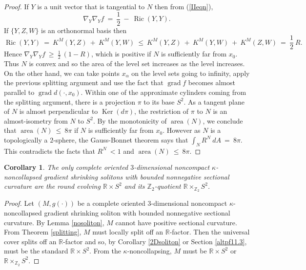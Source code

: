 \documentclass[12pt]{amsart}
\newcommand{\area}{\operatorname{area}}
\newcommand{\grad}{\operatorname{grad}}
\newcommand{\Ker}{\operatorname{Ker}}
\newcommand{\R}{{\mathbb R}}
\newcommand{\Ric}{\operatorname{Ric}}
\newcommand{\Z}{{\mathbb Z}}
\numberwithin{equation}{section}
\theoremstyle{plain}
\newtheorem{corollary}[equation]{Corollary}
\theoremstyle{definition}
\theoremstyle{remark}
\begin{document}
\begin{proof}
If $Y$ is a unit vector that is tangential to $N$ then from (\ref{IIeqn}),
\begin{equation}
\nabla_Y \nabla_Y f \: = \: \frac12 \: - \: \Ric(Y,Y).
\end{equation}
If $\{Y, Z, W\}$ is an orthonormal basis then
\begin{equation}
\Ric(Y, Y) \: = \: K^M(Y,Z) \: + \: K^M(Y, W) \: \le \:
K^M(Y,Z) \: + \: K^M(Y, W) \: + \: K^M(Z, W) \: = \: \frac12 \: R.
\end{equation}
Hence $\nabla_Y \nabla_Y f \: \ge \: \frac12 \: (1-R)$, which is
positive if $N$ is sufficiently far from $x_0$. Thus $N$ is convex
and so 
the area of the level set increases as the level increases.
On the other hand, 
we can take points $x_\alpha$ on the level sets going to
infinity, apply the previous splitting argument 
and use the fact that $\grad f$ becomes almost parallel to
$\grad d(\cdot, x_0)$. Within one of the approximate cylinders coming from the
splitting argument, there is a projection $\pi$ to its base $S^2$. As
a tangent plane of $N$ is almost perpendicular to $\Ker(d\pi)$,
the restriction of $\pi$ to $N$ is an almost-isometry from
$N$ to $S^2$.
By the monotonicity of $\area(N)$, we conclude that
$\area(N) \: \le \: 8\pi$ if $N$ is sufficiently far from $x_0$.
However as $N$ is a topologically a $2$-sphere, 
the Gauss-Bonnet theorem says that
$\int_N R^N \: dA \: = \: 8\pi$. This contradicts the facts that
$R^N \: < 1$ and $\area(N) \: \le \: 8\pi$.
\end{proof}

\begin{corollary} \label{cornosoliton}
The only complete oriented $3$-dimensional noncompact
$\kappa$-noncollapsed gradient shrinking solitons with 
bounded nonnegative sectional curvature are the round
evolving $\R \times S^2$ and its $\Z_2$-quotient
$\R \times_{\Z_2} S^2$.
\end{corollary}
\begin{proof}
Let $(M, g(\cdot))$ be a complete oriented $3$-dimensional noncompact
$\kappa$-noncollapsed gradient shrinking soliton with 
bounded nonnegative sectional curvature. By Lemma \ref{nosoliton}, $M$ cannot
have positive sectional curvature.  From Theorem \ref{splitting},
$M$ must locally split off an $\R$-factor.  Then the universal cover splits
off an $\R$-factor and so, by Corollary \ref{2Dsoliton} or Section
\ref{altpf11.3}, must be the standard $\R \times S^2$. From the 
$\kappa$-noncollapsing, $M$ must be $\R \times S^2$ or $\R \times_{\Z_2} S^2$.
\end{proof}
\end{document}
